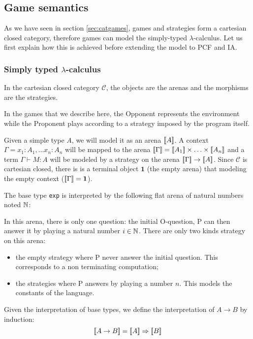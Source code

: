 \subsection{Game semantics}

As we have seen in section \ref{sec:catgames}, games and strategies
form a cartesian closed category, therefore games can model the simply-typed $\lambda$-calculus. Let us first
explain how this is achieved before extending the model to PCF and IA.

\subsubsection{Simply typed $\lambda$-calculus}

In the cartesian closed category $\mathcal{C}$, the objects are the arenas and the morphisms are the strategies.

In the games that we describe here, the Opponent represents the environment while
the Proponent plays according to a strategy imposed by the program itself.


Given a simple type $A$, we will model it as an arena ${[\![ A ]\!]}$.
A context $\Gamma = x_1 :A_1, \ldots x_n:A_n$ will be mapped to the arena
${[\![ \Gamma ]\!]} = {[\![ A_1 ]\!]} \times \ldots \times {[\![A_n ]\!]}$ and a term $\Gamma \vdash M : A$
will be modeled by a strategy on the arena ${[\![ \Gamma ]\!]} \rightarrow {[\![A ]\!]}$.
Since $\mathcal{C}$ is cartesian closed, there is is a terminal object $\textbf{1}$ (the empty arena) that
modeling the empty context (${[\![ \Gamma ]\!]} = \textbf{1}$).


The base type \texttt{exp} is interpreted by the following flat arena of natural numbers noted $\mathbb{N}$:
\begin{center}
    {   \TR{\ldots}
    }
\end{center}
In this arena, there is only one question: the initial O-question, P can then answer it by playing a natural number $i \in \mathbb{N}$.
There are only two kinds strategy on this arena:
\begin{itemize}
\item the empty strategy where P never answer the initial question. This corresponds to a non terminating computation;
\item the strategies where P answers by playing a number $n$. This models the constants of the language.
\end{itemize}

Given the interpretation of base types, we define the interpretation of $A\rightarrow B$ by induction:
$${[\![ A \rightarrow B ]\!]} = {[\![ A ]\!]} \Rightarrow {[\![B ]\!]}$$

